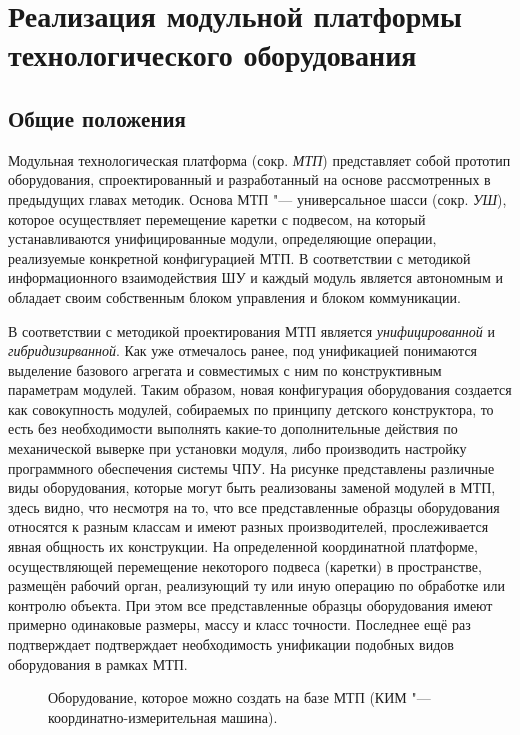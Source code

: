 \chapter{Реализация модульной платформы технологического оборудования}\label{ch:ch4}

\section{Общие положения}

Модульная технологическая платформа (сокр. \textit{МТП}) представляет собой прототип оборудования, спроектированный и разработанный на основе рассмотренных в предыдущих главах методик. Основа МТП "--- универсальное шасси (сокр. \textit{УШ}), которое осуществляет перемещение каретки с подвесом, на который устанавливаются унифицированные модули, определяющие операции, реализуемые конкретной конфигурацией МТП. В соответствии с  методикой информационного взаимодействия ШУ и каждый модуль является автономным и обладает своим собственным блоком управления и блоком коммуникации.

В соответствии с методикой проектирования МТП является \textit{унифицированной} и \textit{гибридизирванной}. Как уже отмечалось ранее, под унификацией понимаются выделение базового агрегата и совместимых с ним по конструктивным параметрам модулей. Таким образом, новая конфигурация оборудования создается как совокупность модулей, собираемых по принципу детского конструктора, то есть без необходимости выполнять какие-то дополнительные действия по механической выверке при установки модуля, либо производить настройку программного обеспечения системы ЧПУ. На рисунке представлены различные виды оборудования, которые могут быть реализованы заменой модулей в МТП, здесь видно, что несмотря на то, что все представленные образцы оборудования относятся к разным классам и имеют разных производителей, прослеживается явная общность их конструкции. На определенной координатной платформе, осуществляющей перемещение некоторого подвеса (каретки) в пространстве, размещён рабочий орган, реализующий ту или иную операцию по обработке или контролю объекта. При этом все представленные образцы оборудования имеют примерно одинаковые размеры, массу и класс точности. Последнее ещё раз подтверждает подтверждает необходимость унификации подобных видов оборудования в рамках МТП.

\begin{figure}[ht]
	\caption{Оборудование, которое можно создать на базе МТП (КИМ "--- координатно-измерительная машина).}\label{fig:equip-types}
\end{figure}

